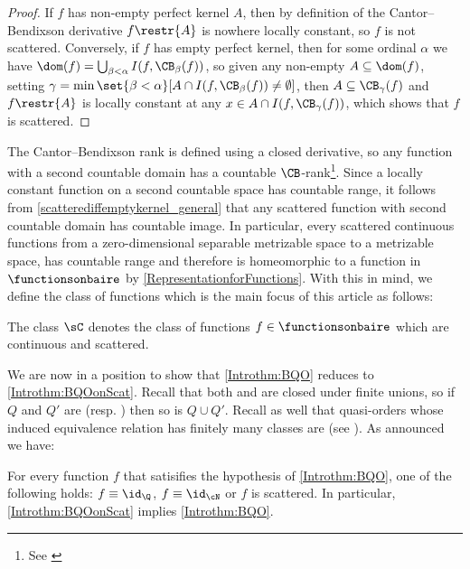 \begin{proof}
If $f$ has non-empty perfect kernel $A$, then by definition of the Cantor--Bendixson derivative $f\restr{A}$ is nowhere locally constant, so $f$ is not scattered.
Conversely, if $f$ has empty perfect kernel, then for some ordinal $\alpha$ we have $\dom(f)=\bigcup_{\beta<\alpha}I(f,\CB_\beta(f))$,
so given any non-empty $A\subseteq\dom(f)$, setting $\gamma=\min\set{\beta<\alpha}[A\cap I(f,\CB_\beta(f))\neq\emptyset]$,
then $A\subseteq \CB_\gamma(f)$ and $f\restr{A}$ is locally constant at any $x\in A\cap I(f,\CB_\gamma(f))$, which shows that $f$ is scattered.
\end{proof}
The Cantor--Bendixson rank is defined using a closed derivative, so any function with a second countable domain has a countable $\CB$-rank\footnote{See \cite[Theorem 6.9]{kechris}}.
Since a locally constant function on a second countable space has countable range, it follows from \cref{scatterediffemptykernel_general} that any scattered function with second countable domain has countable image. 
In particular, every scattered continuous functions from a zero-dimensional separable metrizable space to a metrizable space, has countable range and therefore is homeomorphic to a function in $\functionsonbaire$ by \cref{RepresentationforFunctions}. With this in mind, we define the class of functions which is the main focus of this article as follows: 
{
\begin{definition}
The class $\sC$ denotes the class of functions $f\in \functionsonbaire$ which are continuous and scattered. 
\end{definition}
 }
We are now in a position to show that \cref{Introthm:BQO} reduces to \cref{Introthm:BQOonScat}.
Recall that both \wqo{} and \bqo{} are closed under finite unions, so if $Q$ and $Q'$ are \wqo{} (resp. \bqo{}) then so is $Q\cup Q'$.
Recall as well that quasi-orders whose induced equivalence relation has finitely many classes are \bqo{} (see \cite[Example 3.8 and Proposition 3.11]{wellbetterinbetween}).
As announced we have:

\begin{theorem}\label{FirststepforBQOthm} 
For every function $f$ that satisifies the hypothesis of \cref{Introthm:BQO}, one of the following holds: $f\equiv \id_\Q$, $f\equiv \id_{\cN}$ or $f$ is scattered.
In particular, \cref{Introthm:BQOonScat} implies \cref{Introthm:BQO}.
\end{theorem}

